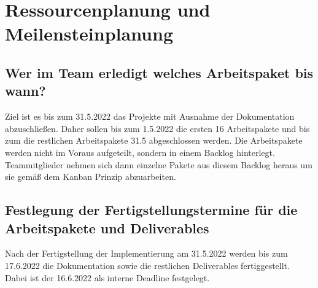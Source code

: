 \section{Ressourcenplanung und Meilensteinplanung}

\subsection{Wer im Team erledigt welches Arbeitspaket bis wann?}


Ziel ist es bis zum 31.5.2022 das Projekte mit Ausnahme der Dokumentation abzuschließen.
Daher sollen bis zum 1.5.2022 die ersten 16 Arbeitspakete und bis zum die restlichen Arbeitspakete 31.5 abgeschlossen werden.
Die Arbeitspakete werden nicht im Voraus aufgeteilt, sondern in einem Backlog hinterlegt. 
Teammitglieder nehmen sich dann einzelne Pakete aus diesem Backlog heraus um sie gemäß dem Kanban Prinzip abzuarbeiten.


\subsection{Festlegung der Fertigstellungstermine für die Arbeitspakete und Deliverables}

Nach der Fertigstellung der Implementierung am 31.5.2022 werden bis zum 17.6.2022 die Dokumentation sowie die restlichen Deliverables fertiggestellt.
Dabei ist der 16.6.2022 als interne Deadline festgelegt.
